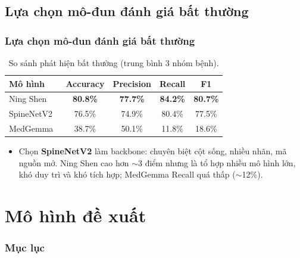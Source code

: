 \documentclass{beamer}
\numberwithin{figure}{section}
\numberwithin{table}{section}
\begin{document}
\subsection{Lựa chọn mô-đun đánh giá bất thường}
\begin{frame}
\frametitle{Lựa chọn mô-đun đánh giá bất thường}
\begin{table}
\centering
\small
\renewcommand{\arraystretch}{1.2}
\begin{tabular}{lcccc}
\toprule
\textbf{Mô hình} & \textbf{Accuracy} & \textbf{Precision} & \textbf{Recall} & \textbf{F1} \\
\midrule
Ning Shen~\cite{nshen7_rsna2024}   & \textbf{80.8\%} & \textbf{77.7\%} & \textbf{84.2\%} & \textbf{80.7\%} \\
SpineNetV2~\cite{windsor2022spinenetv2}  & 76.5\% & 74.9\% & 80.4\% & 77.5\% \\
MedGemma~\cite{google2025medgemma}    & 38.7\% & 50.1\% & 11.8\% & 18.6\% \\
\bottomrule
\end{tabular}
\caption{So sánh phát hiện bất thường (trung bình 3 nhóm bệnh).}
\end{table}
\begin{itemize}
    \item[$\rightarrow$] Chọn \textbf{SpineNetV2} làm backbone: chuyên biệt cột sống, nhiều nhãn, mã nguồn mở. Ning Shen cao hơn $\sim$3 điểm nhưng là tổ hợp nhiều mô hình lớn, khó duy trì và khó tích hợp; MedGemma Recall quá thấp ($\sim$12\%).
\end{itemize}
\end{frame}




\section{Mô hình đề xuất}
{
    \begin{frame}[t]
        \frametitle{Mục lục}
    \end{frame}
}
\end{document}
